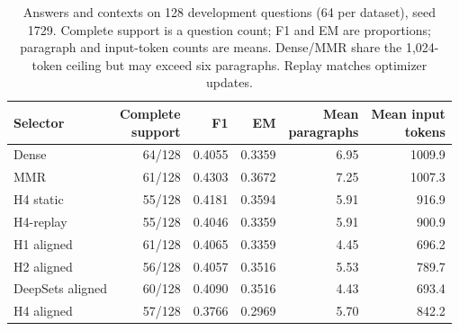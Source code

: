 \begin{table}[!htbp]
\centering\small
\caption{Answers and contexts on 128 development questions (64 per dataset), seed 1729. Complete support is a question count; F1 and EM are proportions; paragraph and input-token counts are means. Dense/MMR share the 1,024-token ceiling but may exceed six paragraphs. Replay matches optimizer updates.}\label{tab:qa}
\begin{tabular}{@{}lrrrrr@{}}\toprule
Selector & \shortstack{Complete\\support} & F1 & EM & \shortstack{Mean\\paragraphs} & \shortstack{Mean input\\tokens} \\
\midrule
Dense & 64/128 & 0.4055 & 0.3359 & 6.95 & 1009.9 \\
MMR & 61/128 & 0.4303 & 0.3672 & 7.25 & 1007.3 \\
H4 static & 55/128 & 0.4181 & 0.3594 & 5.91 & 916.9 \\
H4-replay & 55/128 & 0.4046 & 0.3359 & 5.91 & 900.9 \\
H1 aligned & 61/128 & 0.4065 & 0.3359 & 4.45 & 696.2 \\
H2 aligned & 56/128 & 0.4057 & 0.3516 & 5.53 & 789.7 \\
DeepSets aligned & 60/128 & 0.4090 & 0.3516 & 4.43 & 693.4 \\
H4 aligned & 57/128 & 0.3766 & 0.2969 & 5.70 & 842.2 \\
\bottomrule\end{tabular}
\end{table}
